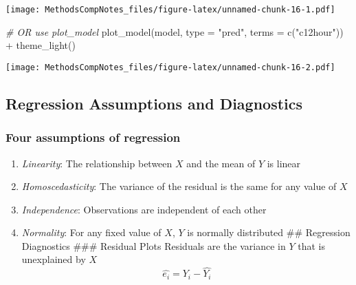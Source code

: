\documentclass[
]{article}
\newenvironment{Shaded}{\begin{snugshade}}{\end{snugshade}}
\newcommand{\AttributeTok}[1]{\textcolor[rgb]{0.77,0.63,0.00}{#1}}
\newcommand{\CommentTok}[1]{\textcolor[rgb]{0.56,0.35,0.01}{\textit{#1}}}
\newcommand{\FunctionTok}[1]{\textcolor[rgb]{0.00,0.00,0.00}{#1}}
\newcommand{\NormalTok}[1]{#1}
\newcommand{\SpecialCharTok}[1]{\textcolor[rgb]{0.00,0.00,0.00}{#1}}
\newcommand{\StringTok}[1]{\textcolor[rgb]{0.31,0.60,0.02}{#1}}
\begin{document}
\texttt{[image: MethodsCompNotes\_files/figure-latex/unnamed-chunk-16-1.pdf]}

\begin{Shaded}
\begin{Highlighting}[]
\CommentTok{\# OR use plot\_model}
\FunctionTok{plot\_model}\NormalTok{(model, }\AttributeTok{type =} \StringTok{"pred"}\NormalTok{, }\AttributeTok{terms =} \FunctionTok{c}\NormalTok{(}\StringTok{"c12hour"}\NormalTok{)) }\SpecialCharTok{+}
  \FunctionTok{theme\_light}\NormalTok{()}
\end{Highlighting}
\end{Shaded}

\texttt{[image: MethodsCompNotes\_files/figure-latex/unnamed-chunk-16-2.pdf]}

\hypertarget{regression-assumptions-and-diagnostics}{%
\subsection{Regression Assumptions and
Diagnostics}\label{regression-assumptions-and-diagnostics}}

\hypertarget{four-assumptions-of-regression}{%
\subsubsection{Four assumptions of
regression}\label{four-assumptions-of-regression}}

\begin{enumerate}
\def\labelenumi{\arabic{enumi}.}
\item
  \emph{Linearity}: The relationship between \(X\) and the mean of \(Y\)
  is linear
\item
  \emph{Homoscedasticity}: The variance of the residual is the same for
  any value of \(X\)
\item
  \emph{Independence}: Observations are independent of each other
\item
  \emph{Normality}: For any fixed value of \(X\), \(Y\) is normally
  distributed \#\# Regression Diagnostics \#\#\# Residual Plots
  Residuals are the variance in \(Y\) that is unexplained by \(X\)
  \[\hat{e_i}=Y_i-\hat{Y_i}\]
\end{enumerate}
\end{document}
